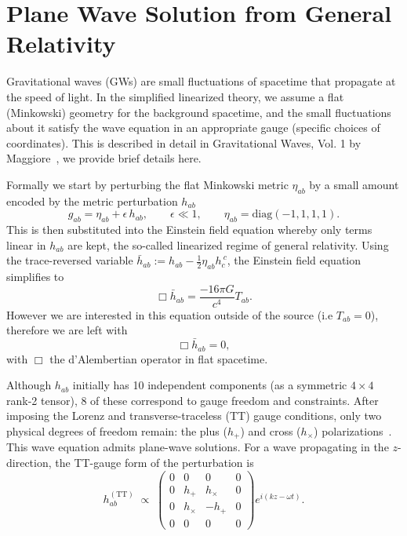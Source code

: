\documentclass{ucdgradtaughtthesis}
\begin{document}
\section{Plane Wave Solution from General Relativity}
\label{sec:GRintro}
Gravitational waves (GWs) are small fluctuations of spacetime that propagate at the speed of light. In the simplified linearized theory, we assume a flat (Minkowski) geometry for the background spacetime, and the small fluctuations about it satisfy the wave equation in an appropriate gauge (specific choices of coordinates). This is described in detail in Gravitational Waves, Vol. 1 by Maggiore~\cite[Sec~ 1.1]{GRbook}, we provide brief
details here.

Formally we start by perturbing the flat Minkowski metric $\eta _{a b}$ by a small amount encoded by
the metric perturbation $h_{a   b}$
\begin{equation}
g_{ab} = \eta_{ab} + \epsilon\,h_{ab},
\qquad
\epsilon \ll 1,
\qquad
\eta_{ab} = \mathrm{diag}(-1, 1, 1, 1).
\end{equation}
This is then substituted into the Einstein field equation whereby only terms linear in $h_{ab}$ are kept,
the so-called linearized regime of general relativity. 
Using the trace-reversed variable $\bar{h}_{ab}:= h_{ab}-\tfrac{1}{2} \eta_{ab} h_c^{\ c}$,
the Einstein field equation simplifies to
\begin{equation}
    \Box \bar{h}_{ab} = \frac{-16\pi G}{c^4} T_{ab}.
\end{equation}
However we are interested in this equation outside of the source (i.e $T_{ab} =0$), therefore we are left with 
\begin{equation}
    \Box \bar{h}_{ab} = 0, 
\end{equation}
with \(\Box\) the d’Alembertian operator in flat spacetime.
%

Although \(h_{ab}\) initially has 10 independent components (as a symmetric $4 \times 4$ rank-2 tensor), 8 of these correspond to gauge freedom and constraints. After imposing the Lorenz and transverse-traceless (TT) gauge conditions, only two physical degrees of freedom remain: the plus (\(h_+\)) and cross (\(h_\times\)) polarizations~\cite[Sec.~1.2]{GRbook}.
This wave equation admits plane-wave solutions. For a wave propagating in the \(z\)-direction, the TT-gauge form of the perturbation is
\begin{equation}
h_{ab}^{(\mathrm{TT})} \;\propto\;
\begin{pmatrix}
0 & 0 & 0 & 0 \\
0 & h_+ & h_\times & 0 \\
0 & h_\times & -h_+ & 0 \\
0 & 0 & 0 & 0
\end{pmatrix}
e^{i(kz-\omega t)}.
\end{equation}
\end{document}
